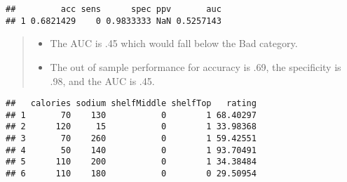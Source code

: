 \documentclass[]{article}
\newenvironment{Shaded}{\begin{snugshade}}{\end{snugshade}}
\newcommand{\CommentTok}[1]{\textcolor[rgb]{0.56,0.35,0.01}{\textit{#1}}}
\newcommand{\DataTypeTok}[1]{\textcolor[rgb]{0.13,0.29,0.53}{#1}}
\newcommand{\DecValTok}[1]{\textcolor[rgb]{0.00,0.00,0.81}{#1}}
\newcommand{\FloatTok}[1]{\textcolor[rgb]{0.00,0.00,0.81}{#1}}
\newcommand{\KeywordTok}[1]{\textcolor[rgb]{0.13,0.29,0.53}{\textbf{#1}}}
\newcommand{\NormalTok}[1]{#1}
\newcommand{\OperatorTok}[1]{\textcolor[rgb]{0.81,0.36,0.00}{\textbf{#1}}}
\newcommand{\StringTok}[1]{\textcolor[rgb]{0.31,0.60,0.02}{#1}}
\providecommand{\tightlist}{%
  \setlength{\itemsep}{0pt}\setlength{\parskip}{0pt}}
\begin{document}
\begin{verbatim}
##         acc sens      spec ppv       auc
## 1 0.6821429    0 0.9833333 NaN 0.5257143
\end{verbatim}

\begin{quote}
\begin{itemize}
\tightlist
\item
  The AUC is .45 which would fall below the Bad category.
\item
  The out of sample performance for accuracy is .69, the specificity is
  .98, and the AUC is .45.
\end{itemize}
\end{quote}

\begin{Shaded}
\end{Shaded}

\begin{verbatim}
##   calories sodium shelfMiddle shelfTop   rating
## 1       70    130           0        1 68.40297
## 2      120     15           0        1 33.98368
## 3       70    260           0        1 59.42551
## 4       50    140           0        1 93.70491
## 5      110    200           0        1 34.38484
## 6      110    180           0        0 29.50954
\end{verbatim}

\begin{Shaded}
\end{Shaded}
\end{document}
